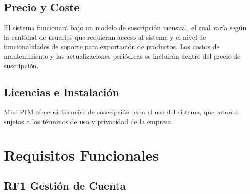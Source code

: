 \documentclass[12pt.a4paper]{article}
\begin{document}
\subsection{Precio y Coste}
El sistema funcionará bajo un modelo de suscripción mensual, el cual varía según la cantidad de usuarios que requieran acceso al sistema y el nivel de funcionalidades de soporte para exportación de productos. Los costos de mantenimiento y las actualizaciones periódicas se incluirán dentro del precio de suscripción.

\subsection{Licencias e Instalación}
Mini PIM ofrecerá licencias de suscripción para el uso del sistema, que estarán sujetas a los términos de uso y privacidad de la empresa.
\section{Requisitos Funcionales}
\subsection*{RF1 Gestión de Cuenta}
\end{document}
